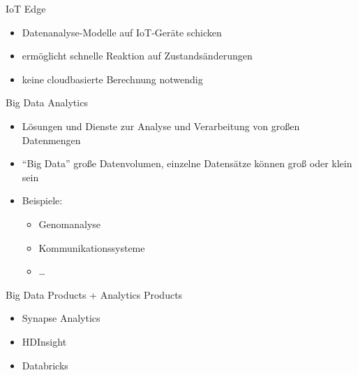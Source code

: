 \begin{flashcard}[Definition]{IoT Edge}
    \begin{itemize}
        \item Datenanalyse-Modelle auf IoT-Geräte schicken
        \item ermöglicht schnelle Reaktion auf Zustandsänderungen
        \item keine cloudbasierte Berechnung notwendig
    \end{itemize}
\end{flashcard}

\begin{flashcard}[Definition]{Big Data Analytics}
    \begin{itemize}
        \item Lösungen und Dienste zur Analyse und Verarbeitung von großen Datenmengen
        \item ``Big Data'' große Datenvolumen, einzelne Datensätze können groß oder klein sein
        \item Beispiele:
            \begin{itemize}
                \item Genomanalyse
                \item Kommunikationssysteme
                \item \ldots
            \end{itemize}
    \end{itemize}
\end{flashcard}

\begin{flashcard}[Describe]{Big Data Products + Analytics Products}
    \begin{itemize}
        \item Synapse Analytics
        \item HDInsight
        \item Databricks
    \end{itemize}

\end{flashcard}

